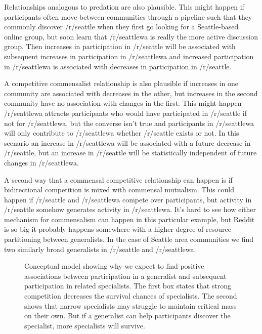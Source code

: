 \documentclass[12pt]{memoir}
\begin{document}
Relationships analogous to predation are also plausible. This might happen if participants often move between communities through a pipeline such that they commonly discover /r/seattle when they first go looking for a Seattle-based online group, but soon learn that /r/seattlewa is really the more active discussion group.   Then increases in participation in /r/seattle will be associated with subsequent increases in participation in /r/seattlewa and increased participation in /r/seattlewa  is associated with decreases in participation in /r/seattle.

A competitive commensalist relationship is also plausible if increases in one community are associated with decreases in the other, but increases in the second community have no association with changes in the first.  This might happen  /r/seattlewa attracts participants who would have participated in /r/seattle if not for /r/seattlewa, but the converse isn't true and participants in /r/seattlewa will only contribute to /r/seattlewa whether /r/seattle exists or not.  In this scenario an increase in /r/seattlewa will be associated with a future decrease in /r/seattle, but an increase in /r/seattle will be statistically independent of future changes in /r/seattlewa.

A second way that a commensal competitive relationship can happen is if bidirectional competition is mixed with commensal mutualism. This could happen if /r/seattle and /r/seattlewa compete over participants, but activity in /r/seattle somehow generates activity in /r/seattlewa. It's hard to see how either mechanism for commensalism can happen in this particular example, but Reddit is so big it probably happens somewhere with a higher degree of resource partitioning between generalists.  In the case of Seattle area communities we find two similarly broad generalists in /r/seattle and /r/seattlewa.

\begin{figure}[t]

\caption{Conceptual model showing why we expect to find positive associations between participation in a generalist and subsequent participation in related specialists.  The first box states that strong competition decreases the survival chances of specialists. The second shows that narrow specialists may struggle to maintain critical mass on their own. But if a generalist can help participants discover the specialist, more specialists will survive. \label{fig:H2}}
\end{figure}
\end{document}
